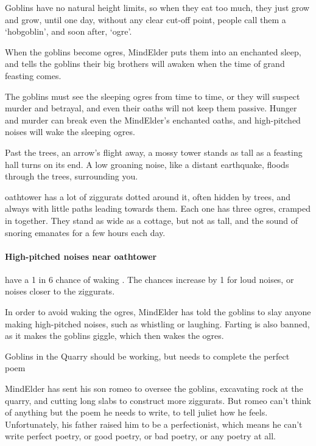 \begin{multicols}{2}
\begin{exampletext}
  Goblins have no natural height limits, so when they eat too much, they just grow and grow, until one day, without any clear cut-off point, people call them a `hobgoblin', and soon after, `\gls{ogre}'.

  When the goblins become \glspl{ogre}, \gls{MindElder} puts them into an enchanted sleep, and tells the goblins their big brothers will awaken when the time of grand feasting comes.

  The goblins must see the sleeping \glspl{ogre} from time to time, or they will suspect murder and betrayal, and even their oaths will not keep them passive.
  Hunger and murder can break even the \gls{MindElder}'s enchanted oaths, and high-pitched noises will wake the sleeping \glspl{ogre}.
\end{exampletext}

\begin{boxtext}
  Past the trees, an arrow's flight away, a mossy tower stands as tall as a feasting hall turns on its end.
  A low groaning noise, like a distant earthquake, floods through the trees, surrounding you.
\end{boxtext}

\Gls{oathtower} has a lot of ziggurats dotted around it, often hidden by trees, and always with little paths leading towards them.
Each one has three \glspl{ogre}, cramped in together.
They stand as wide as a cottage, but not as tall, and the sound of snoring emanates for a few hours each day.

\paragraph{High-pitched noises near \gls{oathtower}}
have a 1 in 6 chance of waking .
The chances increase by 1 for loud noises, or noises closer to the ziggurats.

In order to avoid waking the \glspl{ogre}, \gls{MindElder} has told the goblins to slay anyone making high-pitched noises, such as whistling or laughing.
Farting is also banned, as it makes the goblins giggle, which then wakes the \glspl{ogre}.

{Goblins in the Quarry}%
{ should be working, but needs to complete the perfect poem}%


\Gls{MindElder} has sent his son \gls{romeo} to oversee the goblins, excavating rock at the quarry, and cutting long slabs to construct more ziggurats.
But \gls{romeo} can't think of anything but the poem he needs to write, to tell \gls{juliet} how he feels.
Unfortunately, his father raised him to be a perfectionist, which means he can't write perfect poetry, or good poetry, or bad poetry, or any poetry at all.


\end{multicols}
